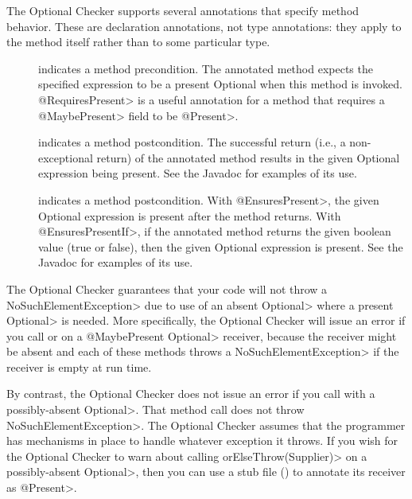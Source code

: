 
The Optional Checker supports several annotations that specify method
behavior.  These are declaration annotations, not type annotations:  they
apply to the method itself rather than to some particular type.

\begin{description}

\item[]
  indicates a method precondition.  The annotated method expects the
  specified expression to be a present Optional when this
  method is invoked. \<@RequiresPresent> is a useful annotation for a method
  that requires a \<@MaybePresent> field to be \<@Present>.
\item[]
  indicates a method postcondition.
  The successful return (i.e., a non-exceptional return) of the annotated
  method results in the given Optional expression being present. See the Javadoc
  for examples of its use.
\item[]
  indicates a method postcondition.  With \<@EnsuresPresent>, the given
  Optional expression is present after the method returns.  With
  \<@EnsuresPresentIf>, if the annotated
  method returns the given boolean value (true or false), then the given
  Optional expression is present. See the Javadoc for examples of its use.

\end{description}



The Optional Checker guarantees that your code will not throw a \<NoSuchElementException>
due to use of an absent \<Optional> where a present \<Optional> is needed.
More specifically, the Optional Checker will issue an error if you call
or
on a \<@MaybePresent Optional> receiver, because the receiver might be absent and
each of these methods throws a \<NoSuchElementException> if the receiver is
empty at run time.

By contrast, the Optional Checker does not issue an error if you call
with a possibly-absent \<Optional>.  That method call does not
throw \<NoSuchElementException>.  The Optional Checker assumes that the
programmer has mechanisms in place to handle whatever exception it throws.
If you wish for the Optional Checker to warn about calling
\<orElseThrow(Supplier)> on a possibly-absent \<Optional>, then you can use
a stub file () to annotate its receiver as \<@Present>.


